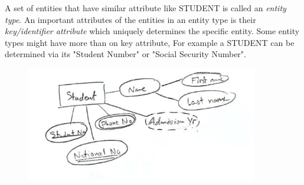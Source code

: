 A set of entities that have similar attribute like STUDENT is called an \textit{entity type}. An important attributes of the entities in an entity type is their \textit{key/identifier attribute} which uniquely determines the specific entity. Some entity types might have more than on key attribute, For example a STUDENT can be determined via its "Student Number" or "Social Security Number".

\begin{figure}[H]
    \centering
    \includegraphics[width = 0.9\textwidth]{Graphics/entity.jpg}
\end{figure}
